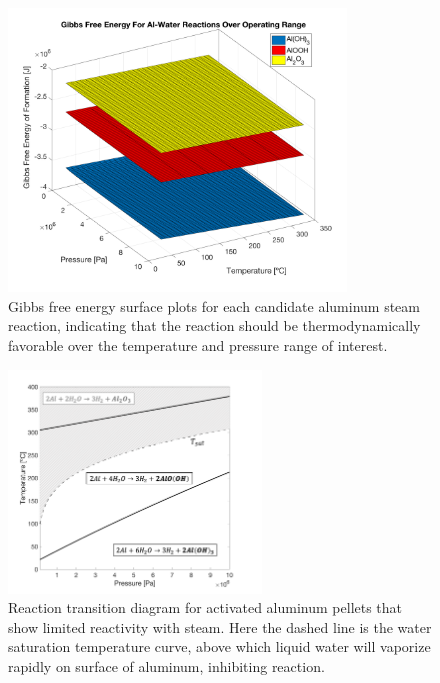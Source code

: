 \documentclass[preprint,12pt,3p]{elsarticle}
\begin{document}
\begin{figure}
  \centering
  \includegraphics[width=0.8\textwidth]{fig/gibbs_steam_total_surface}
  \caption{Gibbs free energy surface plots for each candidate aluminum steam
  reaction, indicating that the reaction should be thermodynamically favorable
over the temperature and pressure range of interest.}
  \label{fig:gibbs_steam_surface}
\end{figure}

\begin{figure}
  \centering
  \includegraphics[width=0.6\textwidth]{fig/transitions_bp}
  \caption{Reaction transition diagram for activated aluminum pellets that show
  limited reactivity with steam. Here the dashed line is the water saturation
temperature curve, above which liquid water will vaporize rapidly on surface of
aluminum, inhibiting reaction.}
  \label{fig:transitions_bp}
\end{figure}
\end{document}
